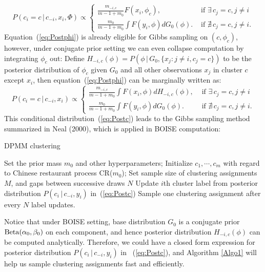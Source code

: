 \documentclass[12pt]{article}
\begin{document}
\begin{equation}\label{eq:Postphi}
P(c_i = c\,|\, c_{-i}, x_i, \Phi) \propto \begin{cases}
		\frac{m_{-i,c}}{m-1+m_0}F(x_i,\phi_c), &\text{ if }
	    \exists \, c_j = c, j\neq i\\
		\frac{m_0}{m-1+m_0}\int F(y_i,\phi)dG_0(\phi). & \text{ if }
		\nexists \, c_j = c, j \neq i.
	\end{cases}
\end{equation}
Equation~(\ref{eq:Postphi}) is already eligible for Gibbs sampling on $(c, \phi_c)$, however, under conjugate prior setting we can even collapse computation by integrating $\phi_c$ out: Define $H_{-i,c}(\phi) = P\left(\phi\,|\,G_0,\{x_j:j\neq i, c_j = c\} \right)$ to be the posterior distribution of $\phi_c$ given $G_0$ and all other observations $x_j$ in cluster $c$ except $x_i$, then equation~(\ref{eq:Postphi}) can be marginally written as:
\begin{equation}\label{eq:Postc}
P(c_i = c\,|\, c_{-i}, x_i) \propto \begin{cases}
		\frac{m_{-i,c}}{m-1+m_0}\int F(x_i,\phi)dH_{-i,c}(\phi), &\text{ if }
	    \exists \, c_j = c, j\neq i\\
		\frac{m_0}{m-1+m_0}\int F(y_i,\phi)dG_0(\phi). & \text{ if }
		\nexists \, c_j = c, j \neq i.
	\end{cases}
\end{equation}
This conditional distribution~(\ref{eq:Postc}) leads to the Gibbs sampling method summarized in Neal (2000), which is applied in BOISE computation:

\begin{algorithm}
\caption{DPMM clustering}\label{Algo1}
\begin{algorithmic}[1]
\State Set the prior mass $m_0$ and other hyperparameters;
\State Initialize $c_1,\cdots,c_m$ with regard to Chinese restaurant process CR($m_0$);
\State Set sample size of clustering assignments $M$, and gaps between successive draws $N$
        \State Update $i$th cluster label from posterior distribution $P(c_i\,|\,c_{-i},y_i)$ in~(\ref{eq:Postc})
    \EndFor
\State Sample one clustering assignment after every $N$ label updates.
\EndWhile
\end{algorithmic}
\end{algorithm}

Notice that under BOISE setting, base distribution $G_0$ is a conjugate prior ${\rm Beta}(\alpha_0,\beta_0)$ on each component, and hence posterior distribution $H_{-i,c}(\phi)$ can be computed analytically. Therefore, we could have a closed form expression for posterior distribution $P(c_i\,|\,c_{-i},y_i)$ in ~(\ref{eq:Postc}), and Algorithm \ref{Algo1} will help us sample clustering assignments fast and efficiently. 
\end{document}
